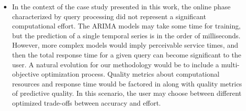 \begin{itemize}
    \item In the context of the case study presented in this work, the online phase characterized by query processing did not represent a significant computational effort. The ARIMA models may take some time for training, but the prediction of a single temporal series is in the order of milliseconds. However, more complex models would imply perceivable service times, and then the total response time for a given query can become significant to the user. A natural evolution for our methodology would be to include a multi-objective optimization process. Quality metrics about computational resources and response time would be factored in along with quality metrics of predictive quality. In this scenario, the user may choose between different optimized trade-offs between accuracy and effort.
\end{itemize}


